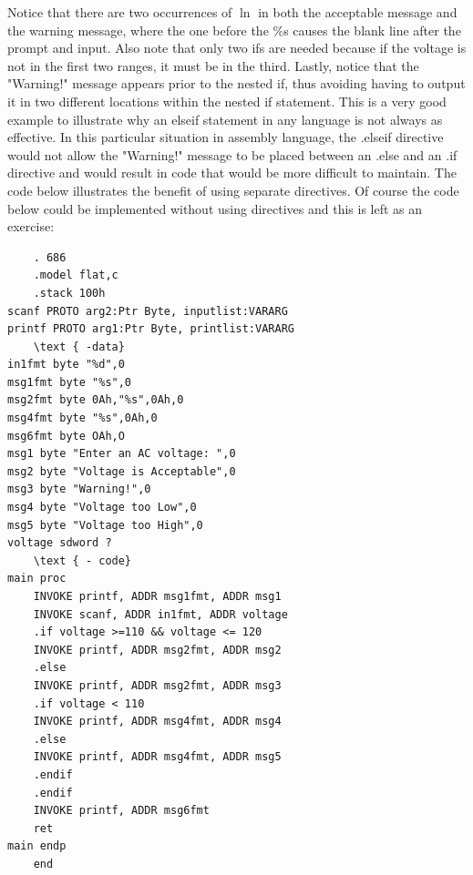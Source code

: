 \documentclass[10pt]{article}
\begin{document}
Notice that there are two occurrences of $\ln$ in both the acceptable message and the warning message, where the one before the \%s causes the blank line after the prompt and input. Also note that only two ifs are needed because if the voltage is not in the first two ranges, it must be in the third. Lastly, notice that the "Warning!" message appears prior to the nested if, thus avoiding having to output it in two different locations within the nested if statement. This is a very good example to illustrate why an elseif statement in any language is not always as effective. In this particular situation in assembly language, the .elseif directive would not allow the "Warning!" message to be placed between an .else and an .if directive and would result in code that would be more difficult to maintain. The code below illustrates the benefit of using separate directives. Of course the code below could be implemented without using directives and this is left as an exercise:

\begin{verbatim}
    . 686
    .model flat,c
    .stack 100h
scanf PROTO arg2:Ptr Byte, inputlist:VARARG
printf PROTO arg1:Ptr Byte, printlist:VARARG
    \text { -data}
in1fmt byte "%d",0
msg1fmt byte "%s",0
msg2fmt byte 0Ah,"%s",0Ah,0
msg4fmt byte "%s",0Ah,0
msg6fmt byte OAh,O
msg1 byte "Enter an AC voltage: ",0
msg2 byte "Voltage is Acceptable",0
msg3 byte "Warning!",0
msg4 byte "Voltage too Low",0
msg5 byte "Voltage too High",0
voltage sdword ?
    \text { - code}
main proc
    INVOKE printf, ADDR msg1fmt, ADDR msg1
    INVOKE scanf, ADDR in1fmt, ADDR voltage
    .if voltage >=110 && voltage <= 120
    INVOKE printf, ADDR msg2fmt, ADDR msg2
    .else
    INVOKE printf, ADDR msg2fmt, ADDR msg3
    .if voltage < 110
    INVOKE printf, ADDR msg4fmt, ADDR msg4
    .else
    INVOKE printf, ADDR msg4fmt, ADDR msg5
    .endif
    .endif
    INVOKE printf, ADDR msg6fmt
    ret
main endp
    end
\end{verbatim}
\end{document}
